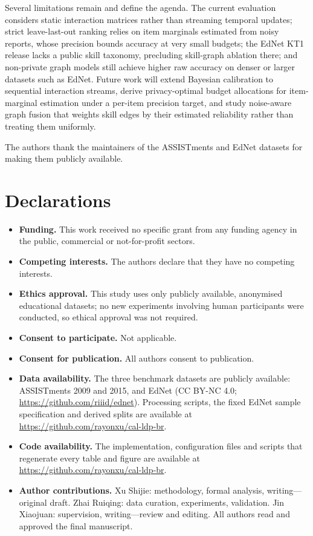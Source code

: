 \documentclass[pdflatex,sn-basic,Numbered]{sn-jnl}
\theoremstyle{plain}
\theoremstyle{remark}
\theoremstyle{definition}
\begin{document}
Several limitations remain and define the agenda. The current evaluation considers static interaction matrices rather than streaming temporal updates; strict leave-last-out ranking relies on item marginals estimated from noisy reports, whose precision bounds accuracy at very small budgets; the EdNet KT1 release lacks a public skill taxonomy, precluding skill-graph ablation there; and non-private graph models still achieve higher raw accuracy on denser or larger datasets such as EdNet. Future work will extend Bayesian calibration to sequential interaction streams, derive privacy-optimal budget allocations for item-marginal estimation under a per-item precision target, and study noise-aware graph fusion that weights skill edges by their estimated reliability rather than treating them uniformly.

\backmatter

The authors thank the maintainers of the ASSISTments and EdNet datasets for making them publicly available.

\section*{Declarations}

\begin{itemize}
\item \textbf{Funding.} This work received no specific grant from any funding agency in the public, commercial or not-for-profit sectors.
\item \textbf{Competing interests.} The authors declare that they have no competing interests.
\item \textbf{Ethics approval.} This study uses only publicly available, anonymised educational datasets; no new experiments involving human participants were conducted, so ethical approval was not required.
\item \textbf{Consent to participate.} Not applicable.
\item \textbf{Consent for publication.} All authors consent to publication.
\item \textbf{Data availability.} The three benchmark datasets are publicly available: ASSISTments 2009 and 2015, and EdNet (CC BY-NC 4.0; \url{https://github.com/riiid/ednet}). Processing scripts, the fixed EdNet sample specification and derived splits are available at \url{https://github.com/rayonxu/cal-ldp-br}.
\item \textbf{Code availability.} The implementation, configuration files and scripts that regenerate every table and figure are available at \url{https://github.com/rayonxu/cal-ldp-br}.
\item \textbf{Author contributions.} Xu Shijie: methodology, formal analysis, writing---original draft. Zhai Ruiqing: data curation, experiments, validation. Jin Xiaojuan: supervision, writing---review and editing. All authors read and approved the final manuscript.
\end{itemize}
\end{document}
